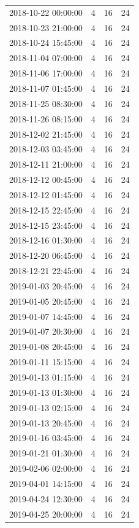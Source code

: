 \begin{tabular}{lrrr}
2018-10-22 00:00:00 & 4 & 16 & 24 \\
2018-10-23 21:00:00 & 4 & 16 & 24 \\
2018-10-24 15:45:00 & 4 & 16 & 24 \\
2018-11-04 07:00:00 & 4 & 16 & 24 \\
2018-11-06 17:00:00 & 4 & 16 & 24 \\
2018-11-07 01:45:00 & 4 & 16 & 24 \\
2018-11-25 08:30:00 & 4 & 16 & 24 \\
2018-11-26 08:15:00 & 4 & 16 & 24 \\
2018-12-02 21:45:00 & 4 & 16 & 24 \\
2018-12-03 03:45:00 & 4 & 16 & 24 \\
2018-12-11 21:00:00 & 4 & 16 & 24 \\
2018-12-12 00:45:00 & 4 & 16 & 24 \\
2018-12-12 01:45:00 & 4 & 16 & 24 \\
2018-12-15 22:45:00 & 4 & 16 & 24 \\
2018-12-15 23:45:00 & 4 & 16 & 24 \\
2018-12-16 01:30:00 & 4 & 16 & 24 \\
2018-12-20 06:45:00 & 4 & 16 & 24 \\
2018-12-21 22:45:00 & 4 & 16 & 24 \\
2019-01-03 20:45:00 & 4 & 16 & 24 \\
2019-01-05 20:45:00 & 4 & 16 & 24 \\
2019-01-07 14:45:00 & 4 & 16 & 24 \\
2019-01-07 20:30:00 & 4 & 16 & 24 \\
2019-01-08 20:45:00 & 4 & 16 & 24 \\
2019-01-11 15:15:00 & 4 & 16 & 24 \\
2019-01-13 01:15:00 & 4 & 16 & 24 \\
2019-01-13 01:30:00 & 4 & 16 & 24 \\
2019-01-13 02:15:00 & 4 & 16 & 24 \\
2019-01-13 20:45:00 & 4 & 16 & 24 \\
2019-01-16 03:45:00 & 4 & 16 & 24 \\
2019-01-21 01:30:00 & 4 & 16 & 24 \\
2019-02-06 02:00:00 & 4 & 16 & 24 \\
2019-04-01 14:15:00 & 4 & 16 & 24 \\
2019-04-24 12:30:00 & 4 & 16 & 24 \\
2019-04-25 20:00:00 & 4 & 16 & 24 \\

\end{tabular}
